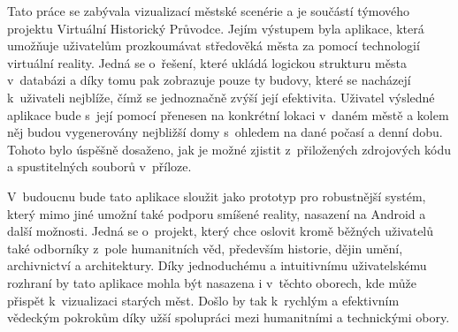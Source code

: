 \documentclass[thesis=B,czech]{FITthesis}[2012/06/26]
\begin{document}
\begin{conclusion}
	   
    Tato práce se zabývala vizualizací městské scenérie a je součástí týmového projektu Virtuální Historický Průvodce. Jejím výstupem byla aplikace, která umožňuje uživatelům prozkoumávat středověká města za pomocí technologií virtuální reality. Jedná se o~řešení, které ukládá  logickou strukturu města v~databázi a díky tomu pak zobrazuje pouze ty budovy, které se nacházejí k~uživateli nejblíže, čímž se jednoznačně zvýší její efektivita. Uživatel výsledné aplikace bude s~její pomocí přenesen na konkrétní lokaci v~daném městě a kolem něj budou vygenerovány nejbližší domy s~ohledem na dané počasí a denní dobu.  Tohoto bylo úspěšně dosaženo, jak je možné zjistit z~přiložených zdrojových kódu a spustitelných souborů v~příloze.
    
     V~budoucnu bude tato aplikace sloužit jako prototyp pro robustnější systém, který mimo jiné umožní také podporu smíšené reality, nasazení na Android a další možnosti. Jedná se o~projekt, který chce oslovit kromě běžných uživatelů také odborníky z~pole humanitních věd, především historie, dějin umění, archivnictví a architektury. Díky jednoduchému a intuitivnímu uživatelskému rozhraní by tato aplikace mohla být nasazena i v~těchto oborech, kde může přispět k~vizualizaci starých měst. Došlo by tak k~rychlým a efektivním vědeckým pokrokům díky užší spolupráci mezi humanitními a technickými obory.
\end{conclusion}






\appendix
\end{document}
